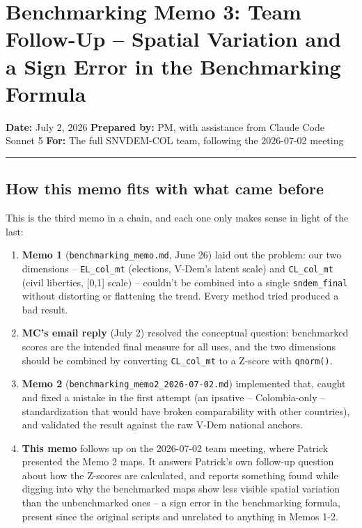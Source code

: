 \documentclass[
]{article}
\author{}
\date{\vspace{-2.5em}}
\providecommand{\tightlist}{%
  \setlength{\itemsep}{0pt}\setlength{\parskip}{0pt}}
\begin{document}
\hypertarget{benchmarking-memo-3-team-follow-up-spatial-variation-and-a-sign-error-in-the-benchmarking-formula}{%
\section{Benchmarking Memo 3: Team Follow-Up -- Spatial Variation and a
Sign Error in the Benchmarking
Formula}\label{benchmarking-memo-3-team-follow-up-spatial-variation-and-a-sign-error-in-the-benchmarking-formula}}

\textbf{Date:} July 2, 2026 \textbf{Prepared by:} PM, with assistance
from Claude Code Sonnet 5 \textbf{For:} The full SNVDEM-COL team,
following the 2026-07-02 meeting

\begin{center}\rule{0.5\linewidth}{0.5pt}\end{center}

\hypertarget{how-this-memo-fits-with-what-came-before}{%
\subsection{How this memo fits with what came
before}\label{how-this-memo-fits-with-what-came-before}}

This is the third memo in a chain, and each one only makes sense in
light of the last:

\begin{enumerate}
\def\labelenumi{\arabic{enumi}.}
\tightlist
\item
  \textbf{Memo 1} (\texttt{benchmarking\_memo.md}, June 26) laid out the
  problem: our two dimensions -- \texttt{EL\_col\_mt} (elections,
  V-Dem's latent scale) and \texttt{CL\_col\_mt} (civil liberties,
  {[}0,1{]} scale) -- couldn't be combined into a single
  \texttt{sndem\_final} without distorting or flattening the trend.
  Every method tried produced a bad result.
\item
  \textbf{MC's email reply} (July 2) resolved the conceptual question:
  benchmarked scores are the intended final measure for all uses, and
  the two dimensions should be combined by converting
  \texttt{CL\_col\_mt} to a Z-score with \texttt{qnorm()}.
\item
  \textbf{Memo 2} (\texttt{benchmarking\_memo2\_2026-07-02.md})
  implemented that, caught and fixed a mistake in the first attempt (an
  ipsative -- Colombia-only -- standardization that would have broken
  comparability with other countries), and validated the result against
  the raw V-Dem national anchors.
\item
  \textbf{This memo} follows up on the 2026-07-02 team meeting, where
  Patrick presented the Memo 2 maps. It answers Patrick's own follow-up
  question about how the Z-scores are calculated, and reports something
  found while digging into why the benchmarked maps show less visible
  spatial variation than the unbenchmarked ones -- a sign error in the
  benchmarking formula, present since the original scripts and unrelated
  to anything in Memos 1-2.
\end{enumerate}
\end{document}
